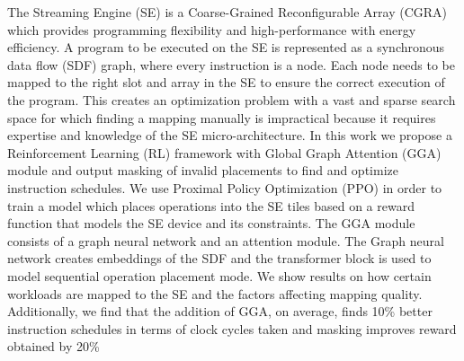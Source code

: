 

The Streaming Engine (SE) is a Coarse-Grained Reconfigurable Array (CGRA) which provides programming flexibility and high-performance with energy efficiency.
A program to be executed on the SE is represented as a synchronous data flow (SDF) graph, where every instruction is a node.
Each node needs to be mapped to the right slot and array in the SE to ensure the correct execution of the program.
This creates an optimization problem with a vast and sparse search space for which finding a mapping manually is impractical because it requires expertise and knowledge of the SE micro-architecture.
In this work we propose a Reinforcement Learning (RL) framework with Global Graph Attention (GGA) module and output masking of invalid placements to find and optimize instruction schedules.
We use Proximal Policy Optimization (PPO) in order to train a model which places operations into the SE tiles based on a reward function that models the SE device and its constraints.
The GGA module consists of a graph neural network and an attention module. 
The Graph neural network creates embeddings of the SDF and the transformer block is used to model sequential operation placement mode. 
We show results on how certain workloads are mapped to the SE and the factors affecting mapping quality.
Additionally, we find that the addition of GGA, on average, finds 10\% better instruction schedules in terms of clock cycles taken and masking improves reward obtained by 20\%
